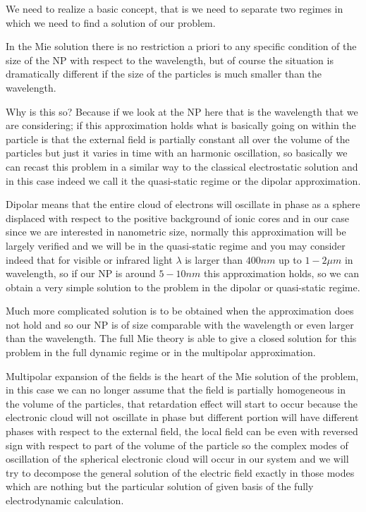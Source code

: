 \documentclass[../main/main.tex]{subfiles}
\begin{document}
We need to realize a basic concept, that is we need to separate two regimes in which we need to find a solution of our problem. 

In the Mie solution there is no restriction a priori to any specific condition of the size of the NP with respect to the wavelength, but of course the situation is dramatically different if the size of the particles is much smaller than the wavelength. 

Why is this so? Because if we look at the NP here that is the wavelength that we are considering; if this approximation holds what is basically going on within the particle is that the external field is partially constant all over the volume of the particles but just it varies in time with an harmonic oscillation, so basically we can recast this problem in a similar way to the classical electrostatic solution and in this case indeed we call it the quasi-static regime or the dipolar approximation.

Dipolar means that the entire cloud of electrons will oscillate in phase as a sphere displaced with respect to the positive background of ionic cores and in our case since we are interested in nanometric size, normally this approximation will be largely verified and we will be in the quasi-static regime and you may consider indeed that for visible or infrared light $\lambda$ is larger than $400 nm$ up to $1-2 \mu m$ in wavelength, so if our NP is around $5-10 nm$ this approximation holds, so we can obtain a very simple solution to the problem in the dipolar or quasi-static regime. 

Much more complicated solution is to be obtained when the approximation does not hold and so our NP is of size comparable with the wavelength or even larger than the wavelength. The full Mie theory is able to give a closed solution for this problem in the full dynamic regime or in the multipolar approximation.

Multipolar expansion of the fields is the heart of the Mie solution of the problem, in this case we can no longer assume that the field is partially homogeneous in the volume of the particles, that retardation effect will start to occur because the electronic cloud will not oscillate in phase but different portion will have different phases with respect to the external field, the local field can be even with reversed sign with respect to part of the volume of the particle so the complex modes of oscillation of the spherical electronic cloud will occur in our system and we will try to decompose the general solution of the electric field exactly in those modes which are nothing but the particular solution of given basis of the fully electrodynamic calculation.
\end{document}
